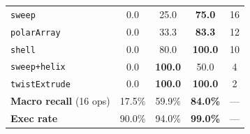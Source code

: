 \begin{table}[t]
\begin{tabular}{l c c c c}
  \texttt{sweep}        & 0.0            & 25.0           & \textbf{75.0}  & 16 \\
  \texttt{polarArray}   & 0.0            & 33.3           & \textbf{83.3}  & 12 \\
  \texttt{shell}        & 0.0            & 80.0           & \textbf{100.0} & 10 \\
  \texttt{sweep+helix}  & 0.0            & \textbf{100.0} & 50.0           & 4  \\
  \texttt{twistExtrude} & 0.0            & \textbf{100.0} & \textbf{100.0} & 2  \\
  \midrule
  \textbf{Macro recall} (16 ops) & 17.5\% & 59.9\% & \textbf{84.0\%} & --- \\
  \textbf{Exec rate}             & 90.0\% & 94.0\% & \textbf{99.0\%} & --- \\
  \bottomrule
  \end{tabular}
\end{table}